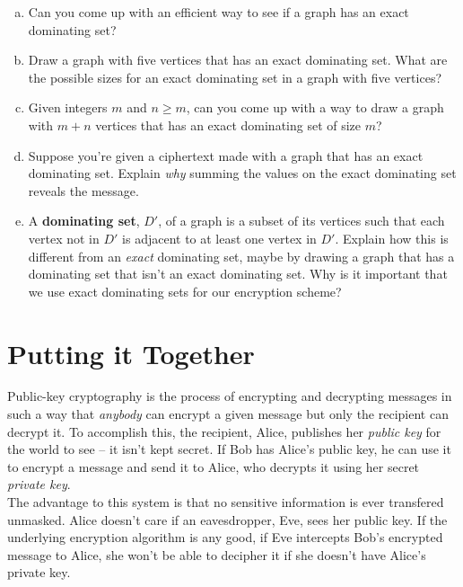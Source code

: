 \documentclass[12pt]{article}
\begin{document}
\begin{enumerate}[(a)]
	\item Can you come up with an efficient way to see if a graph has an exact dominating set?
	\newpage
	\item Draw a graph with five vertices that has an exact dominating set. What are the possible sizes for an exact dominating set in a graph with five vertices?
	\vspace{3cm}

	\item Given integers $m$ and $n\geq m$, can you come up with a way to draw a graph with $m+n$ vertices that has an exact dominating set of size $m$?

	\vspace{3cm}

	\item Suppose you're given a ciphertext made with a graph that has an exact dominating set. Explain \textit{why} summing the values on the exact dominating set reveals the message.

	\vspace{3cm}

	\item A \textbf{dominating set}, $D'$, of a graph is a subset of its vertices such that each vertex not in $D'$ is adjacent to at least one vertex in $D'$. Explain how this is different from an \textit{exact} dominating set, maybe by drawing a graph that has a dominating set that isn't an exact dominating set. Why is it important that we use exact dominating sets for our encryption scheme?
\end{enumerate}
\newpage

\section*{Putting it Together}
Public-key cryptography is the process of encrypting and decrypting messages in such a way that \textit{anybody} can encrypt a given message but only the recipient can decrypt it. To accomplish this, the recipient, Alice, publishes her \textit{public key} for the world to see -- it isn't kept secret. If Bob has Alice's public key, he can use it to encrypt a message and send it to Alice, who decrypts it using her secret \textit{private key}.\\

\noindent The advantage to this system is that no sensitive information is ever transfered unmasked. Alice doesn't care if an eavesdropper, Eve, sees her public key. If the underlying encryption algorithm is any good, if Eve intercepts Bob's encrypted message to Alice, she won't be able to decipher it if she doesn't have Alice's private key.
\end{document}

